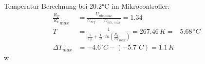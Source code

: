\\
Temperatur Berechnung bei 20.2°C im Mikrocontroller:
\begin{align}
\frac{R_T}{R_V}_{max} &= \frac{U_{ntc,max}}{U_{ref}\;-\;U_{ntc,max}} = 1.34\\
T &= \frac{1}{\frac{1}{T_{25}}+\frac{1}{B} \cdot ln(\frac{R_T}{R_V}_{max})} = 267.46\,K = -5.68\,^\circ C\\
\Delta T_{max} &= -4.6^\circ C - (-5.7^\circ C) = 1.1\,K
\end{align}w






